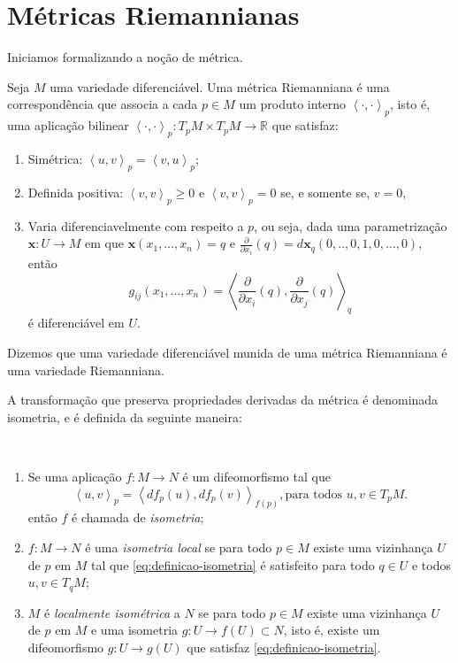 \section{Métricas Riemannianas}
\label{sec:metricas-Riemannianas}
Iniciamos formalizando a noção de métrica.
\begin{definition}
	\label{def:metrica-Riemanniana}
	Seja $M$ uma variedade diferenciável. Uma métrica Riemanniana é uma correspondência que associa a cada $p \in M$ um produto interno $\left<\cdot, \cdot\right>_{p}$, isto é, uma aplicação bilinear $\left<\cdot,\cdot\right>_{p}:T_{p}M\times T_{p}M\to \mathbb{R}$ que satisfaz:
	\begin{enumerate}[label=(\roman*)]
		\item Simétrica: $\left<u, v\right>_{p}= \left<v,u\right>_{p}$;
		\item Definida positiva: $\left<v, v\right>_{p} \geq 0$ e $\left<v,v\right>_{p}=0$ se, e somente se, $v=0$,
		\item Varia diferenciavelmente com respeito a $p$, ou seja, dada uma parametrização $\mathbf{x}:U\to M$ em que $\mathbf{x}(x_{1}, \dots, x_{n})=q$ e $\frac{\partial}{\partial x_{i}}(q)=d\mathbf{x}_{q}(0, .., 0, 1, 0, \dots, 0)$, então
		      \begin{equation*}
			      g_{ij}(x_{1}, \dots, x_{n})=\left<\frac{\partial}{\partial x_{i}}(q),\frac{\partial}{\partial x_{j}}(q)\right>_{q}
		      \end{equation*}
		      é diferenciável em $U$.
	\end{enumerate}
\end{definition}
Dizemos que uma variedade diferenciável munida de uma métrica Riemanniana é uma variedade Riemanniana.

A transformação que preserva propriedades derivadas da métrica é denominada isometria, e é definida da seguinte maneira:

\begin{definition}
	$ $
	\begin{enumerate}[label=(\roman*)]
		\item Se uma aplicação $f:M\to N$ é um difeomorfismo tal que
		      \begin{equation}
			      \label{eq:definicao-isometria}
			      \left< u, v \right>_{p}=\left< df_{p}(u), df_{p}(v) \right>_{f(p)}, \text{para todos } u,v \in T_{p}M.
		      \end{equation}
		      então $f$ é chamada de \emph{isometria};
		\item $f:M\to N$ é uma \emph{isometria local} se para todo $p \in M$ existe uma vizinhança $U$ de $p$ em $M$ tal que \eqref{eq:definicao-isometria} é satisfeito para todo $q \in U$ e todos $u,v \in T_{q}M$;
		\item $M$ é \emph{localmente isométrica} a $N$ se para todo $p \in M$ existe uma vizinhança $U$ de $p$ em $M$ e uma isometria $g:U\to f(U) \subset N$, isto é, existe um difeomorfismo $g:U\to g(U)$ que satisfaz \eqref{eq:definicao-isometria}.
	\end{enumerate}
\end{definition}


